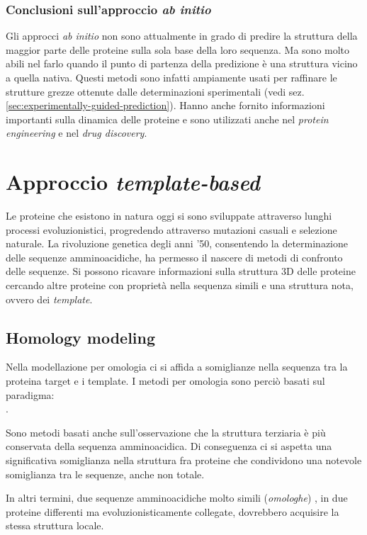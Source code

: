 {\subsubsection{Conclusioni sull'approccio \textit{ab initio}}
Gli approcci \textit{ab initio} non sono attualmente in grado di predire la struttura della maggior parte delle proteine sulla sola base della loro sequenza. Ma sono molto abili nel farlo quando il punto di partenza della predizione è una struttura vicino a quella nativa. Questi metodi sono infatti ampiamente usati per raffinare le strutture grezze ottenute dalle determinazioni sperimentali (vedi sez. \ref{sec:experimentally-guided-prediction}). Hanno anche fornito informazioni importanti sulla dinamica delle proteine e sono utilizzati anche nel \textit{protein engineering} e nel \textit{drug discovery}.

}

\section{Approccio \textit{template-based}}
Le proteine che esistono in natura oggi si sono sviluppate attraverso lunghi processi evoluzionistici, progredendo attraverso mutazioni casuali e selezione naturale. La rivoluzione genetica degli anni '50, consentendo la determinazione delle sequenze amminoacidiche, ha permesso il nascere di metodi di confronto delle sequenze. Si possono ricavare informazioni sulla struttura 3D delle proteine cercando altre proteine con proprietà nella sequenza simili e una struttura nota, ovvero dei \textit{template}. 

\subsection{Homology modeling}
Nella modellazione per omologia ci si affida a somiglianze nella sequenza tra la proteina target e i template. I metodi per omologia sono perciò basati sul paradigma: \\
 .

\par Sono metodi basati anche sull'osservazione che la struttura terziaria è più conservata della sequenza amminoacidica. Di conseguenza ci si aspetta una significativa somiglianza nella struttura fra proteine che condividono una notevole somiglianza tra le sequenze, anche non totale.

\par In altri termini, due sequenze amminoacidiche molto simili (\textit{omologhe}) , in due proteine differenti ma evoluzionisticamente collegate, dovrebbero acquisire la stessa struttura locale.

